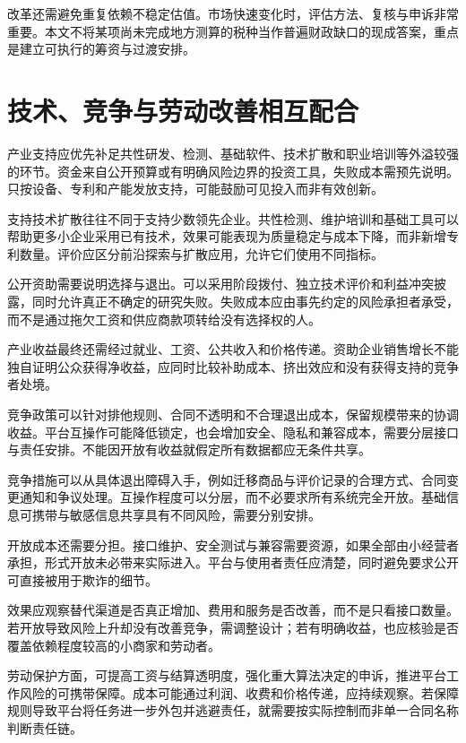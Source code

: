 \documentclass[UTF8,fontset=fandol,zihao=-4,oneside,openany]{ctexbook}
\begin{document}
改革还需避免重复依赖不稳定估值。市场快速变化时，评估方法、复核与申诉非常重要。本文不将某项尚未完成地方测算的税种当作普遍财政缺口的现成答案，重点是建立可执行的筹资与过渡安排。

\section{技术、竞争与劳动改善相互配合}
产业支持应优先补足共性研发、检测、基础软件、技术扩散和职业培训等外溢较强的环节。资金来自公开预算或有明确风险边界的投资工具，失败成本需预先说明。只按设备、专利和产能发放支持，可能鼓励可见投入而非有效创新。

\label{arg:P270}
支持技术扩散往往不同于支持少数领先企业。共性检测、维护培训和基础工具可以帮助更多小企业采用已有技术，效果可能表现为质量稳定与成本下降，而非新增专利数量。评价应区分前沿探索与扩散应用，允许它们使用不同指标。

公开资助需要说明选择与退出。可以采用阶段拨付、独立技术评价和利益冲突披露，同时允许真正不确定的研究失败。失败成本应由事先约定的风险承担者承受，而不是通过拖欠工资和供应商款项转给没有选择权的人。

产业收益最终还需经过就业、工资、公共收入和价格传递。资助企业销售增长不能独自证明公众获得净收益，应同时比较补助成本、挤出效应和没有获得支持的竞争者处境。

竞争政策可以针对排他规则、合同不透明和不合理退出成本，保留规模带来的协调收益。平台互操作可能降低锁定，也会增加安全、隐私和兼容成本，需要分层接口与责任安排。不能因开放有收益就假定所有数据都应无条件共享。

\label{arg:P271}
竞争措施可以从具体退出障碍入手，例如迁移商品与评价记录的合理方式、合同变更通知和争议处理。互操作程度可以分层，而不必要求所有系统完全开放。基础信息可携带与敏感信息共享具有不同风险，需要分别安排。

开放成本还需要分担。接口维护、安全测试与兼容需要资源，如果全部由小经营者承担，形式开放未必带来实际进入。平台与使用者责任应清楚，同时避免要求公开可直接被用于欺诈的细节。

效果应观察替代渠道是否真正增加、费用和服务是否改善，而不是只看接口数量。若开放导致风险上升却没有改善竞争，需调整设计；若有明确收益，也应核验是否覆盖依赖程度较高的小商家和劳动者。

劳动保护方面，可提高工资与结算透明度，强化重大算法决定的申诉，推进平台工作风险的可携带保障。成本可能通过利润、收费和价格传递，应持续观察。若保障规则导致平台将任务进一步外包并逃避责任，就需要按实际控制而非单一合同名称判断责任链。
\end{document}
